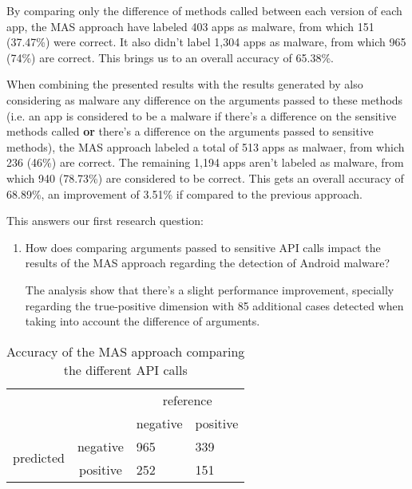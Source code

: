 By comparing only the difference of methods called between each version of each app, the MAS approach have labeled 403 apps as malware, from which 151 (37.47\%) were correct. It also didn't label 1,304 apps as malware, from which 965 (74\%) are correct. This brings us to an overall accuracy of 65.38\%.

When combining the presented results with the results generated by also considering as malware any difference on the arguments passed to these methods (i.e. an app is considered to be a malware if there's a difference on the sensitive methods called \textbf{or} there's a difference on the arguments passed to sensitive methods), the MAS approach labeled a total of 513 apps as malwaer, from which 236 (46\%) are correct. The remaining 1,194 apps aren't labeled as malware, from which 940 (78.73\%) are considered to be correct. This gets an overall accuracy of 68.89\%, an improvement of 3.51\% if compared to the previous approach. 

This answers our first research question: 

\begin{enumerate}
    \item How does comparing arguments passed to sensitive API calls impact the results of the MAS approach regarding the detection of Android malware?

    The analysis show that there's a slight performance improvement, specially regarding the true-positive dimension with 85 additional cases detected when taking into account the difference of arguments. 
\end{enumerate}

\begin{table}[]
\centering
\caption{Accuracy of the MAS approach comparing the different API calls}
\label{tab:prev-confusion-matrix}
\begin{tabular}{llll}
                                                &                               & \multicolumn{2}{c}{reference}                                 \\ \cline{3-4} 
                                                & \multicolumn{1}{l|}{}         & \multicolumn{1}{c|}{negative} & \multicolumn{1}{c|}{positive} \\ \cline{2-4} 
\multicolumn{1}{c|}{\multirow{2}{*}{predicted}} & \multicolumn{1}{c|}{negative} & \multicolumn{1}{l|}{965}      & \multicolumn{1}{l|}{339}      \\ \cline{2-4} 
\multicolumn{1}{c|}{}                           & \multicolumn{1}{c|}{positive} & \multicolumn{1}{l|}{252}      & \multicolumn{1}{l|}{151}      \\ \cline{2-4} 
\end{tabular}
\end{table}

